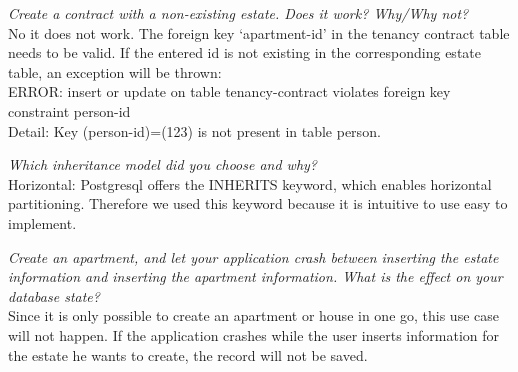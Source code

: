 \documentclass[ngerman]{dis-template-add}
\begin{document}
\textit{Create a contract with a non-existing estate. Does it work? Why/Why not?
} \\
No it does not work. The foreign key `apartment-id' in the tenancy contract table needs to be valid. If the entered id is not existing in the corresponding estate table, an exception will be thrown: \\
ERROR: insert or update on table tenancy-contract violates foreign key constraint person-id \\
Detail: Key (person-id)=(123) is not present in table person.

\textit{Which inheritance model did you choose and why?
} \\
Horizontal: Postgresql offers the INHERITS keyword, which enables horizontal partitioning. Therefore we used this keyword because it is intuitive to use easy to implement.

\textit{Create an apartment, and let your application crash between inserting the estate information and inserting the apartment information. What is the effect on your database state?
} \\
Since it is only possible to create an apartment or house in one go, this use case will not happen.
If the application crashes while the user inserts information for the estate he wants to create, the record will not be saved.
\end{document}
